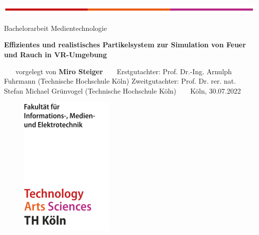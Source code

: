 \documentclass[a4paper,11pt]{article} %
\renewcommand{\\}{\vspace*{0.5\baselineskip} \newline}
\begin{document}

\begin{titlepage}
	\begin{flushleft}
		\includegraphics[width=\textwidth]{Grafiken/TH/TH.png}\\
		\vspace*{2cm}
	\end{flushleft}

	\begin{flushleft}
		Bachelorarbeit Medientechnologie
	\end{flushleft}

	\begin{huge}
		\noindent
		\bfseries
		Effizientes und realistisches Partikelsystem zur Simulation von Feuer und Rauch in VR-Umgebung \\
	\end{huge}
	~\\
	~\\
	\noindent
	vorgelegt von                   \\
	\textbf{Miro Steiger}			\\
	~\\
	~\\
	\noindent
	Erstgutachter: Prof. Dr.-Ing. Arnulph Fuhrmann (Technische Hochschule Köln)              \\
	Zweitgutachter:  Prof. Dr. rer. nat. Stefan Michael Grünvogel (Technische Hochschule Köln)
	~\\
	~\\
	Köln, 30.07.2022
	~\\
	~\\
	\begin{figure}[b]
		\begin{flushright}
			\includegraphics[scale=1]{Grafiken/TH/TH_F07_cover.png}\\
		\end{flushright}
	\end{figure}

	\pagestyle{fancy}
\end{titlepage}
\end{document}
